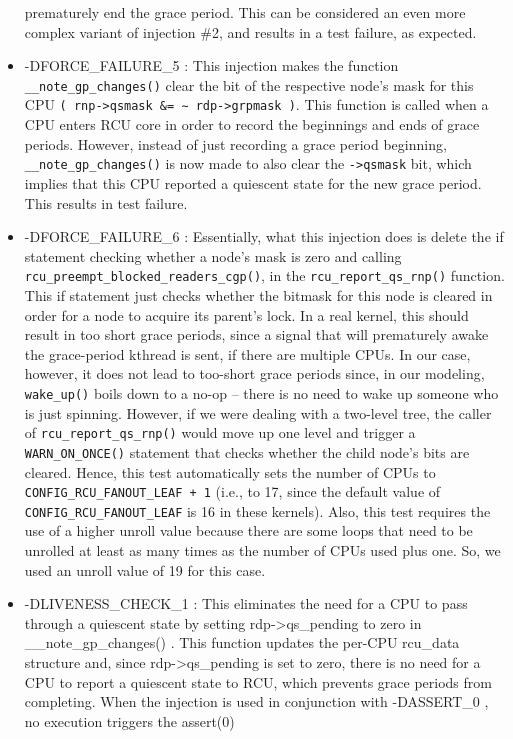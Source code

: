 \begin{itemize}
prematurely end the grace period. This can be considered an even more
complex variant of injection \#2, and results in a test failure, as expected.
\item
-DFORCE\_FAILURE\_5 : This injection makes the function \verb|__note_gp_changes()| clear the bit of the respective node’s mask for this CPU \verb|( rnp->qsmask &= ∼ rdp->grpmask )|.
This function is called when a CPU enters RCU core in order to record the beginnings and ends of grace periods. However, instead of just recording a grace period beginning,
\verb|__note_gp_changes()| is now made to also clear the \verb|->qsmask| bit, which implies that this CPU reported a quiescent state for the new grace period. This results in test failure.
\item
-DFORCE\_FAILURE\_6 : Essentially, what this injection does is delete the if statement checking whether a 
node’s mask is zero and calling \verb|rcu_preempt_blocked_readers_cgp()|,
in the \verb|rcu_report_qs_rnp()| function. This if statement just checks whether the bitmask for this node is 
cleared in order for a node to acquire its parent’s lock. In a real
kernel, this should result in too short grace periods, since a signal that will prematurely awake the 
grace-period kthread is sent, if there are multiple CPUs. In our case,
however, it does not lead to too-short grace periods since, in our modeling, \verb|wake_up()| boils down to a no-op – there is no 
need to wake up someone who is just spinning.
However, if we were dealing with a two-level tree, the caller of \verb|rcu_report_qs_rnp()| would move up one level and trigger a 
\verb|WARN_ON_ONCE()| statement that checks
whether the child node’s bits are cleared. Hence, this test automatically sets the number of CPUs to \verb|CONFIG_RCU_FANOUT_LEAF + 1| 
(i.e., to 17, since the default value of \verb|CONFIG_RCU_FANOUT_LEAF| is 16 in these kernels). 
Also, this test requires the use of a higher unroll value because there are some loops that need to be 
unrolled at least as many times as the number of CPUs used plus one. So, we used an unroll value of 19 for this case.
\item
-DLIVENESS\_CHECK\_1 : This eliminates the need for a CPU to pass through a quiescent state by setting 
rdp->qs\_pending to zero in \_\_note\_gp\_changes() . This function updates
the per-CPU rcu\_data structure and, since rdp->qs\_pending is set to zero, there is no need for a CPU to report a quiescent 
state to RCU, which prevents grace periods from completing. When the injection is used in conjunction with -DASSERT\_0 , no execution triggers the assert(0) 

\end{itemize}
